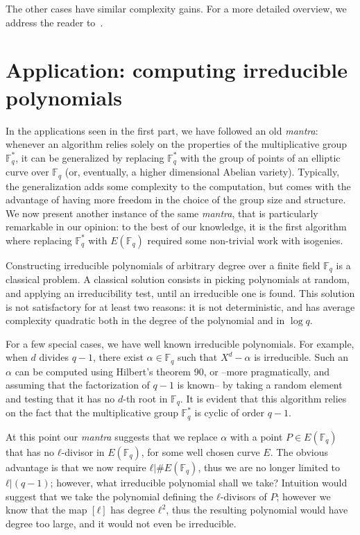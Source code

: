 \documentclass[10pt]{article}
\theoremstyle{plain}
\theoremstyle{definition}
\def\F{\ensuremath{\mathbb{F}}}
\begin{document}
\begin{prposition}
The other cases have similar complexity gains. %
For a more detailed overview, we address the reader
to~\cite{schoof95,lercier-algorithmique,elkies98,sutherland10}.


\section{Application: computing irreducible polynomials }

In the applications seen in the first part, we have followed an old
\emph{mantra}: whenever an algorithm relies solely on the properties
of the multiplicative group $\F_q^*$, it can be generalized by
replacing $\F_q^*$ with the group of points of an elliptic curve over
$\F_q$ (or, eventually, a higher dimensional Abelian variety). %
Typically, the generalization adds some complexity to the computation,
but comes with the advantage of having more freedom in the choice of
the group size and structure. %
We now present another instance of the same \emph{mantra}, that is
particularly remarkable in our opinion: to the best of our knowledge,
it is the first algorithm where replacing $\F_q^*$ with $E(\F_q)$
required some non-trivial work with isogenies.

Constructing irreducible polynomials of arbitrary degree over a finite
field $\F_q$ is a classical problem. %
A classical solution consists in picking polynomials at random, and
applying an irreducibility test, until an irreducible one is found. %
This solution is not satisfactory for at least two reasons: it is not
deterministic, and has average complexity quadratic both in the degree
of the polynomial and in $\log q$.

For a few special cases, we have well known irreducible polynomials. %
For example, when $d$ divides $q-1$, there exist $α∈\F_q$ such that
$X^d-α$ is irreducible. %
Such an $α$ can be computed using Hilbert's theorem 90, or --more
pragmatically, and assuming that the factorization of $q-1$ is known--
by taking a random element and testing that it has no $d$-th root in
$\F_q$. %
It is evident that this algorithm relies on the fact that the
multiplicative group $\F_q^*$ is cyclic of order $q-1$.

At this point our \emph{mantra} suggests that we replace $α$ with a
point $P∈E(\F_q)$ that has no $ℓ$-divisor in $E(\F_q)$, for some well
chosen curve $E$. %
The obvious advantage is that we now require $ℓ|\#E(\F_q)$, thus we
are no longer limited to $ℓ|(q-1)$; however, what irreducible
polynomial shall we take? %
Intuition would suggest that we take the polynomial defining the
$ℓ$-divisors of $P$; however we know that the map $[ℓ]$ has degree
$ℓ^2$, thus the resulting polynomial would have degree too large, and
it would not even be irreducible.


\end{prposition}
\end{document}
